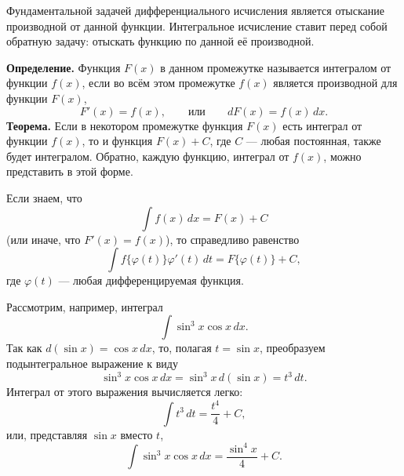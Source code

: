 \begin{rusblock}
Фундаментальной задачей дифференциального исчисления является отыскание производной от данной функции. Интегральное исчисление ставит перед собой обратную задачу: отыскать функцию по данной её производной.

\textbf{Определение.} Функция $F(x)$ в данном промежутке называется интегралом от функции $f(x)$, если во всём этом промежутке $f(x)$ является производной для функции $F(x)$,
\[
F'(x)=f(x),\qquad\text{или}\qquad dF(x)=f(x)\,dx.
\]
\textbf{Теорема.} Если в некотором промежутке функция $F(x)$ есть интеграл от функции $f(x)$, то и функция $F(x)+C$, где $C$ --- любая постоянная, также будет интегралом. Обратно, каждую функцию, интеграл от $f(x)$, можно представить в этой форме.
\end{rusblock}

\begin{rusblock}
Если знаем, что
\[
\int f(x)\,dx=F(x)+C
\]
(или иначе, что $F'(x)=f(x)$), то справедливо равенство
\[
\int f\{\varphi(t)\}\varphi'(t)\,dt=F\{\varphi(t)\}+C,
\]
где $\varphi(t)$ --- любая дифференцируемая функция.

Рассмотрим, например, интеграл
\[
\int \sin^3x\cos x\,dx.
\]
Так как $d(\sin x)=\cos x\,dx$, то, полагая $t=\sin x$, преобразуем подынтегральное выражение к виду
\[
\sin^3x\cos x\,dx=\sin^3x\,d(\sin x)=t^3\,dt.
\]
Интеграл от этого выражения вычисляется легко:
\[
\int t^3\,dt=\frac{t^4}{4}+C,
\]
или, представляя $\sin x$ вместо $t$,
\[
\int\sin^3x\cos x\,dx=\frac{\sin^4x}{4}+C.
\]
\end{rusblock}

